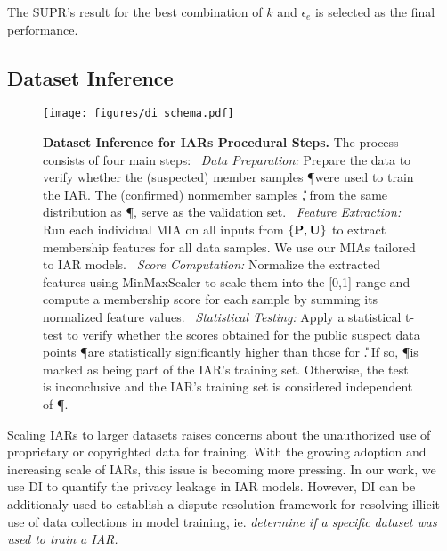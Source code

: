 {The SUPR's result for the best combination of $k$ and $\epsilon_e$ is selected as the final performance.}

\subsection{Dataset Inference}
\label{app:di_section}

\begin{figure}[h]
    \centering
    \texttt{[image: figures/di\_schema.pdf]}
\caption{\textbf{Dataset Inference for IARs Procedural Steps.} The process consists of four main steps: 
~\textit{Data Preparation:} Prepare the data to verify whether the (suspected) member samples \P were used to train the IAR. The (confirmed) nonmember samples \U, from the same distribution as \P, serve as the validation set.
~\textit{Feature Extraction:} Run each individual MIA on all inputs from $\{\textbf{P},\textbf{U}\}$ to extract membership features for all data samples. We use our MIAs tailored to IAR models. 
~\textit{Score Computation:} Normalize the extracted features using MinMaxScaler to scale them into the [0,1] range and compute a membership score for each sample by summing its normalized feature values.
~\textit{Statistical Testing:} Apply a statistical t-test to verify whether the scores obtained for the public suspect data points \P are statistically significantly higher than those for \U. If so, \P is marked as being part of the IAR's training set. Otherwise, the test is inconclusive and the IAR's training set is considered independent of \P.}
    \label{fig:di_schema}
\end{figure}


Scaling IARs to larger datasets raises concerns about the unauthorized use of proprietary or copyrighted data for training. With the growing adoption and increasing scale of IARs, this issue is becoming more pressing. In our work, we use DI to quantify the privacy leakage in IAR models. However, DI can  be additionaly used to establish a dispute-resolution framework for resolving illicit use of data collections in model training, ie. \textit{determine if a specific dataset was used to train a IAR.}  
 
